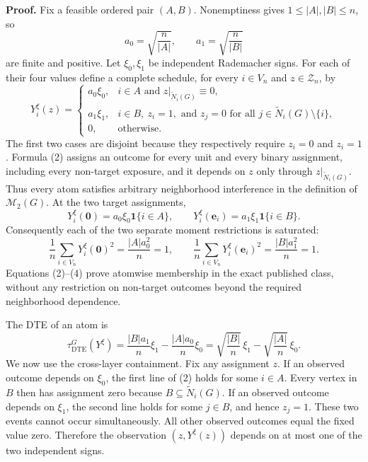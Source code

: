\textbf{Proof.}
Fix a feasible ordered pair \((A,B)\).  Nonemptiness gives \(1\leq |A|,|B|\leq n\), so
\[
a_0=\sqrt{\frac{n}{|A|}},
\qquad
a_1=\sqrt{\frac{n}{|B|}}
\tag{1}
\]
are finite and positive.  Let \(\xi_0,\xi_1\) be independent Rademacher signs.  For each of their four values define a complete schedule, for every \(i\in V_n\) and \(z\in\mathcal Z_n\), by
\[
Y_i^{\xi}(z)=
\begin{cases}
a_0\xi_0,
& i\in A\text{ and }z|_{\widetilde N_i(G)}\equiv0,\\
a_1\xi_1,
& i\in B,\ z_i=1,\text{ and }z_j=0
   \text{ for all }j\in\widetilde N_i(G)\setminus\{i\},\\
0,&\text{otherwise}.
\end{cases}
\tag{2}
\]
The first two cases are disjoint because they respectively require \(z_i=0\) and \(z_i=1\).  Formula (2) assigns an outcome for every unit and every binary assignment, including every non-target exposure, and it depends on \(z\) only through \(z|_{\widetilde N_i(G)}\).  Thus every atom satisfies arbitrary neighborhood interference in the definition of \(\mathcal M_2(G)\).  At the two target assignments,
\[
Y_i^{\xi}(\mathbf 0)=a_0\xi_0\mathbf 1\{i\in A\},
\qquad
Y_i^{\xi}(\mathbf e_i)=a_1\xi_1\mathbf 1\{i\in B\}.
\tag{3}
\]
Consequently each of the two separate moment restrictions is saturated:
\[
\frac1n\sum_{i\in V_n}Y_i^{\xi}(\mathbf0)^2
=\frac{|A|a_0^2}{n}=1,
\qquad
\frac1n\sum_{i\in V_n}Y_i^{\xi}(\mathbf e_i)^2
=\frac{|B|a_1^2}{n}=1.
\tag{4}
\]
Equations (2)--(4) prove atomwise membership in the exact published class, without any restriction on non-target outcomes beyond the required neighborhood dependence.

The DTE of an atom is
\[
\tau_{\mathrm{DTE}}^G(Y^{\xi})
=\frac{|B|a_1}{n}\xi_1-\frac{|A|a_0}{n}\xi_0
=\sqrt{\frac{|B|}{n}}\,\xi_1
-\sqrt{\frac{|A|}{n}}\,\xi_0.
\tag{5}
\]
We now use the cross-layer containment.  Fix any assignment \(z\).  If an observed outcome depends on \(\xi_0\), the first line of (2) holds for some \(i\in A\).  Every vertex in \(B\) then has assignment zero because \(B\subseteq\widetilde N_i(G)\).  If an observed outcome depends on \(\xi_1\), the second line holds for some \(j\in B\), and hence \(z_j=1\).  These two events cannot occur simultaneously.  All other observed outcomes equal the fixed value zero.  Therefore the observation \((z,Y^{\xi}(z))\) depends on at most one of the two independent signs.

